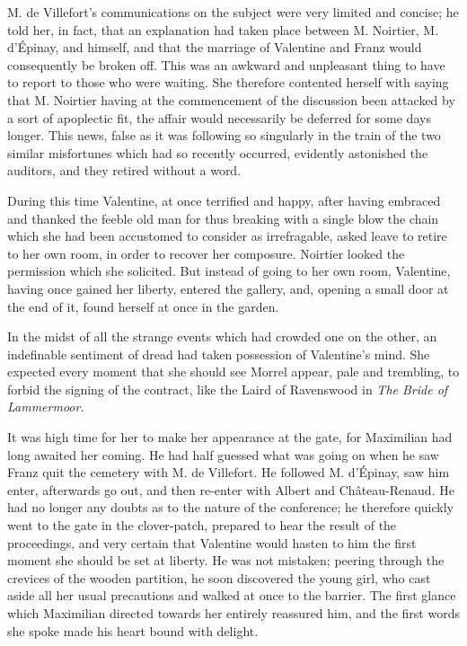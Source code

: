 M. de Villefort’s communications on the subject were very limited and
concise; he told her, in fact, that an explanation had taken place
between M. Noirtier, M. d’Épinay, and himself, and that the marriage of
Valentine and Franz would consequently be broken off. This was an
awkward and unpleasant thing to have to report to those who were
waiting. She therefore contented herself with saying that M. Noirtier
having at the commencement of the discussion been attacked by a sort of
apoplectic fit, the affair would necessarily be deferred for some days
longer. This news, false as it was following so singularly in the train
of the two similar misfortunes which had so recently occurred,
evidently astonished the auditors, and they retired without a word.

During this time Valentine, at once terrified and happy, after having
embraced and thanked the feeble old man for thus breaking with a single
blow the chain which she had been accustomed to consider as
irrefragable, asked leave to retire to her own room, in order to
recover her composure. Noirtier looked the permission which she
solicited. But instead of going to her own room, Valentine, having once
gained her liberty, entered the gallery, and, opening a small door at
the end of it, found herself at once in the garden.

In the midst of all the strange events which had crowded one on the
other, an indefinable sentiment of dread had taken possession of
Valentine’s mind. She expected every moment that she should see Morrel
appear, pale and trembling, to forbid the signing of the contract, like
the Laird of Ravenswood in \textit{The Bride of Lammermoor}.

It was high time for her to make her appearance at the gate, for
Maximilian had long awaited her coming. He had half guessed what was
going on when he saw Franz quit the cemetery with M. de Villefort. He
followed M. d’Épinay, saw him enter, afterwards go out, and then
re-enter with Albert and Château-Renaud. He had no longer any doubts as
to the nature of the conference; he therefore quickly went to the gate
in the clover-patch, prepared to hear the result of the proceedings,
and very certain that Valentine would hasten to him the first moment
she should be set at liberty. He was not mistaken; peering through the
crevices of the wooden partition, he soon discovered the young girl,
who cast aside all her usual precautions and walked at once to the
barrier. The first glance which Maximilian directed towards her
entirely reassured him, and the first words she spoke made his heart
bound with delight.

